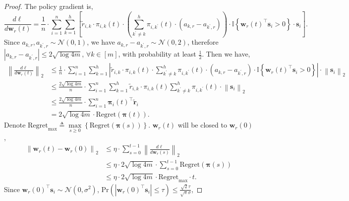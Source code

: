 \documentclass[10pt]{article}
\def\rvs{{\mathbf{s}}}
\def\rvw{{\mathbf{w}}}
\def\rvtilder{{\tilde{\mathbf{r}}}}
\def\pr{{\text{Pr}}}
\def\regret{{\text{Regret}}}
\def\rvpi{{\boldsymbol{\pi}}}
\def\sI{{\mathbb{I}}}
\def\gN{{\mathcal{N}}}
\begin{document}
\begin{proof}
The policy gradient is,
\begin{equation*}
	\frac{d\ell}{d \rvw_r(t)} = \frac{1}{n} \cdot \sum\limits_{i=1}^{n}{ \sum\limits_{k=1}^{h}{ \left[ \tilde{r}_{i,k} \cdot \pi_{i,k}(t) \cdot \left( \sum\limits_{k^\prime \not= k}^{h}{ \pi_{i,k^\prime}(t) \cdot \left( a_{k,r} - a_{k^\prime,r} \right)  } \right) \cdot \sI\left\{ \rvw_r(t)^\top \rvs_i > 0 \right\} \cdot \rvs_i \right] } }.
\end{equation*}
Since $a_{k,r}, a_{k^\prime,r} \sim \gN(0, 1)$, we have $a_{k,r} - a_{k^\prime,r} \sim \gN(0, 2)$, therefore $\left| a_{k,r} - a_{k^\prime,r} \right| \le 2 \sqrt{\log{4m}}$, $\forall k \in [m]$, with  probability at least $\frac{1}{2} $. Then we have,
\begin{equation*}
\begin{split}
	\left\| \frac{d\ell}{d \rvw_r(t)} \right\|_2 &\le \frac{1}{n} \cdot \sum\limits_{i=1}^{n}{ \sum\limits_{k=1}^{h}{ \left| \tilde{r}_{i,k} \cdot \pi_{i,k}(t) \cdot \sum\limits_{k^\prime \not= k}^{h}{ \pi_{i,k^\prime}(t) \cdot \left( a_{k,r} - a_{k^\prime,r} \right)  } \cdot \sI\left\{ \rvw_r(t)^\top \rvs_i > 0 \right\} \right| \cdot \left\| \rvs_i \right\|_2 }} \\
	&\le \frac{2 \sqrt{\log{4m}}}{n} \cdot \sum\limits_{i=1}^{n}{ \sum\limits_{k=1}^{h}{ \tilde{r}_{i,k} \cdot \pi_{i,k}(t) \sum\limits_{k^\prime \not= k}^{h}{ \pi_{i,k^\prime}(t)  } \cdot \left\| \rvs_i \right\|_2  }} \\
	&\le \frac{2 \sqrt{\log{4m}}}{n} \cdot \sum\limits_{i=1}^{n}{ \rvpi_{i}(t)^\top \rvtilder_i } \\
	&= 2 \sqrt{\log{4m}} \cdot \regret(\rvpi(t)).
\end{split}
\end{equation*}
Denote $\regret_{\max} \triangleq \max\limits_{s \ge 0}\left\{\regret\left( \rvpi(s) \right)\right\}$. $\rvw_r(t)$ will be closed to $\rvw_r(0)$,
\begin{equation*}
\begin{split}
	\left\| \rvw_r(t) - \rvw_r(0) \right\|_2 &\le \eta \cdot \sum\limits_{s=0}^{t-1}{\left\| \frac{d\ell}{d \rvw_r(s)} \right\|_2} \\
	&\le \eta \cdot 2 \sqrt{\log{4m}} \cdot \sum\limits_{s=0}^{t-1}{ \regret(\rvpi(s)) } \\
	&\le \eta \cdot 2 \sqrt{\log{4m}} \cdot \regret_{\max} \cdot t .
\end{split}
\end{equation*}
Since $\rvw_r(0)^\top \rvs_i \sim \gN(0, \sigma^2)$, $\pr\left(\left| \rvw_r(0)^\top \rvs_i \right| \le \tau\right) \le  \frac{\sqrt{2}\tau}{\sqrt{\pi}\sigma}$,

\end{proof}
\end{document}
